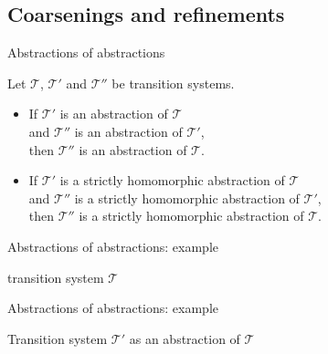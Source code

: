 \documentclass{gkibeamer}
\begin{document}
\subsection[Refinements]{Coarsenings and refinements}

\begin{frame}{Abstractions of abstractions}
  \begin{theorem}
    Let $\mathcal T$, $\mathcal T'$ and $\mathcal T''$ be transition
    systems.

    \begin{itemize}
    \item If $\mathcal T'$ is an abstraction of $\mathcal T$ \\
      and $\mathcal T''$ is an abstraction of $\mathcal T'$, \\
      then $\mathcal T''$ is an abstraction of $\mathcal T$.
    \item If $\mathcal T'$ is a strictly homomorphic abstraction of
      $\mathcal T$ \\
      and $\mathcal T''$ is a strictly homomorphic abstraction of
      $\mathcal T'$, \\
      then $\mathcal T''$ is a strictly homomorphic abstraction of
      $\mathcal T$.
    \end{itemize}
  \end{theorem}
\end{frame}

\begin{frame}{Abstractions of abstractions: example}
  \begin{center}
    \picfulltransitiongraph

    \bigskip

    \alert{transition system $\mathcal T$}
  \end{center}
\end{frame}

\begin{frame}{Abstractions of abstractions: example}
  \begin{center}
    \picprojectionpackagetruck

    \bigskip

    \alert{Transition system $\mathcal T'$ as an abstraction of
      $\mathcal T$}
  \end{center}
\end{frame}
\end{document}
